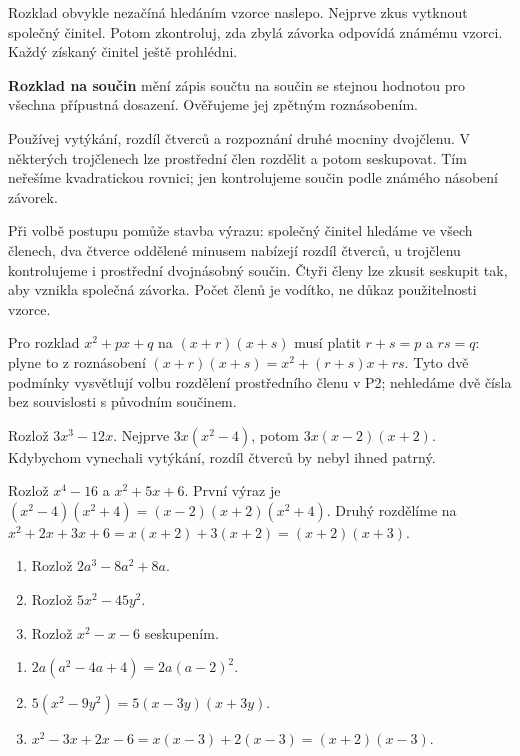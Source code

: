 \documentclass[11pt,a4paper]{article}
\begin{document}

Rozklad obvykle nezačíná hledáním vzorce naslepo. Nejprve zkus vytknout společný činitel. Potom zkontroluj, zda zbylá závorka odpovídá známému vzorci. Každý získaný činitel ještě prohlédni.

\begin{definiceBox}[title={Připomenutí definice},breakable=false]
\textbf{Rozklad na součin} mění zápis součtu na součin se stejnou hodnotou pro všechna přípustná dosazení. Ověřujeme jej zpětným roznásobením.
\end{definiceBox}


Používej vytýkání, rozdíl čtverců a rozpoznání druhé mocniny dvojčlenu. V některých trojčlenech lze prostřední člen rozdělit a potom seskupovat. Tím neřešíme kvadratickou rovnici; jen kontrolujeme součin podle známého násobení závorek.

Při volbě postupu pomůže stavba výrazu: společný činitel hledáme
ve všech členech, dva čtverce oddělené minusem nabízejí rozdíl čtverců,
u trojčlenu kontrolujeme i prostřední dvojnásobný součin.
Čtyři členy lze zkusit seskupit tak, aby vznikla společná závorka.
Počet členů je vodítko, ne důkaz použitelnosti vzorce.

Pro rozklad $x^2+px+q$ na $(x+r)(x+s)$ musí platit
$r+s=p$ a $rs=q$: plyne to z roznásobení
$(x+r)(x+s)=x^2+(r+s)x+rs$.
Tyto dvě podmínky vysvětlují volbu rozdělení prostředního členu v P2;
nehledáme dvě čísla bez souvislosti s původním součinem.


\begin{prikladReseniBox}[title={Příklad 1},breakable=false]
Rozlož $3x^3-12x$.
\tcblower
Nejprve $3x(x^2-4)$, potom $3x(x-2)(x+2)$. Kdybychom vynechali vytýkání, rozdíl čtverců by nebyl ihned patrný.
\end{prikladReseniBox}


\begin{prikladReseniBox}[title={Příklad 2},breakable=false]
Rozlož $x^4-16$ a $x^2+5x+6$.
\tcblower
První výraz je $(x^2-4)(x^2+4)=(x-2)(x+2)(x^2+4)$. Druhý rozdělíme na $x^2+2x+3x+6=x(x+2)+3(x+2)=(x+2)(x+3)$.
\end{prikladReseniBox}



\begin{zadaniReseniBox}[title={Procvičení},breakable=false]
\begin{enumerate}[label=\alph*)]
\item Rozlož $2a^3-8a^2+8a$.
\item Rozlož $5x^2-45y^2$.
\item Rozlož $x^2-x-6$ seskupením.
\end{enumerate}
\tcblower
\begin{enumerate}[label=\alph*)]
\item $2a(a^2-4a+4)=2a(a-2)^2$.
\item $5(x^2-9y^2)=5(x-3y)(x+3y)$.
\item $x^2-3x+2x-6=x(x-3)+2(x-3)=(x+2)(x-3)$.
\end{enumerate}
\end{zadaniReseniBox}
\end{document}
